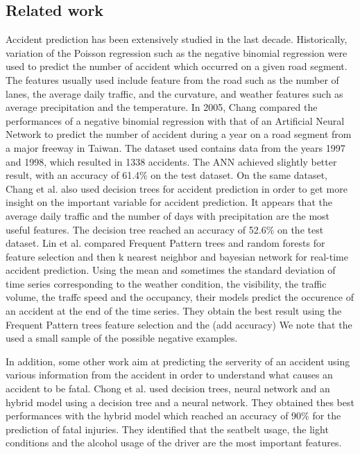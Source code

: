\documentclass[conference]{IEEEtran}
\begin{document}
\subsection{Related work}
Accident prediction has been extensively studied in the last decade. Historically, variation of the Poisson regression such as the negative binomial regression were used to predict the number of accident which occurred on a given road segment. The features usually used include feature from the road such as the number of lanes, the average daily traffic, and the curvature, and weather features such as average precipitation and the temperature. In 2005, Chang \cite{Change2005} compared the performances of a negative binomial regression with that of an Artificial Neural Network to predict the number of accident during a year on a road segment from a major freeway in Taiwan. The dataset used contains data from the years 1997 and 1998, which resulted in 1338 accidents. The ANN achieved slightly better result, with an accuracy of 61.4\% on the test dataset. On the same dataset, Chang et al.\cite{Chang2005b} also used decision trees for accident prediction in order to get more insight on the important variable for accident prediction. It appears that the average daily traffic and the number of days with precipitation are the most useful features. The decision tree reached an accuracy of 52.6\% on the test dataset. Lin et al. \cite{Lin2015} compared Frequent Pattern trees and random forests for feature selection and then k nearest neighbor and bayesian network for real-time accident prediction. Using the mean and sometimes the standard deviation of time series corresponding to the weather condition, the visibility, the traffic volume, the traffc speed and the occupancy, their models predict the occurence of an accident at the end of the time series. They obtain the best result using the Frequent Pattern trees feature selection and the  (add accuracy)
We note that the used a small sample of the possible negative examples.

  In addition, some other work aim at predicting the serverity of an accident using various information from the accident in order to understand what causes an accident to be fatal. Chong et al. \cite{Chong2005} used decision trees, neural network and an hybrid model using a decision tree and a neural network. They obtained thes best performances with the hybrid model which reached an accuracy of 90\% for the prediction of fatal injuries. They identified that the seatbelt usage, the light conditions and the alcohol usage of the driver are the most important features.
 
\end{document}
